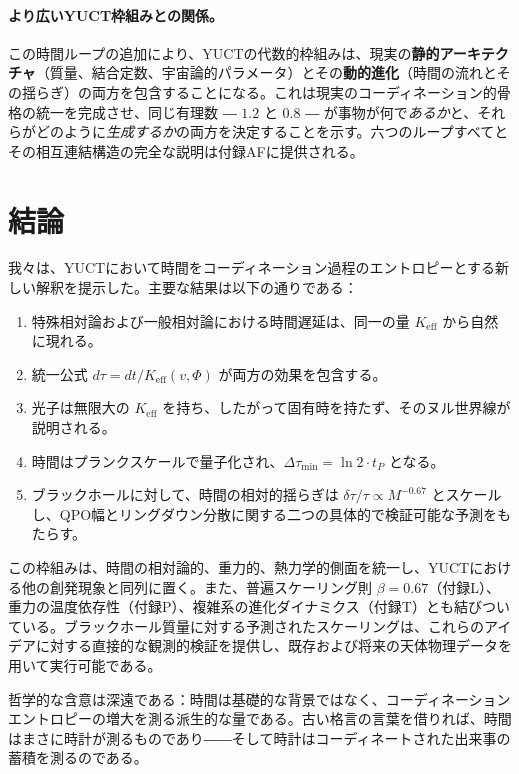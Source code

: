 \documentclass[12pt,a4paper]{article}
\newcommand{\Keff}{K_{\mathrm{eff}}}
\begin{document}
	\paragraph{より広いYUCT枠組みとの関係。}
	この時間ループの追加により、YUCTの代数的枠組みは、現実の\textbf{静的アーキテクチャ}（質量、結合定数、宇宙論的パラメータ）とその\textbf{動的進化}（時間の流れとその揺らぎ）の両方を包含することになる。これは現実のコーディネーション的骨格の統一を完成させ、同じ有理数 ― \(1.2\) と \(0.8\) ― が事物が何で\textit{あるか}と、それらがどのように\textit{生成するか}の両方を決定することを示す。六つのループすべてとその相互連結構造の完全な説明は付録AFに提供される。
	
	\section{結論}
	
	我々は、YUCTにおいて時間をコーディネーション過程のエントロピーとする新しい解釈を提示した。主要な結果は以下の通りである：
	\begin{enumerate}
		\item 特殊相対論および一般相対論における時間遅延は、同一の量 \(\Keff\) から自然に現れる。
		\item 統一公式 \(d\tau = dt/\Keff(v,\Phi)\) が両方の効果を包含する。
		\item 光子は無限大の \(\Keff\) を持ち、したがって固有時を持たず、そのヌル世界線が説明される。
		\item 時間はプランクスケールで量子化され、\(\Delta \tau_{\min} = \ln 2 \cdot t_P\) となる。
		\item ブラックホールに対して、時間の相対的揺らぎは \(\delta\tau/\tau \propto M^{-0.67}\) とスケールし、QPO幅とリングダウン分散に関する二つの具体的で検証可能な予測をもたらす。
	\end{enumerate}
	
	この枠組みは、時間の相対論的、重力的、熱力学的側面を統一し、YUCTにおける他の創発現象と同列に置く。また、普遍スケーリング則 \(\beta = 0.67\)（付録L）、重力の温度依存性（付録P）、複雑系の進化ダイナミクス（付録T）とも結びついている。ブラックホール質量に対する予測されたスケーリングは、これらのアイデアに対する直接的な観測的検証を提供し、既存および将来の天体物理データを用いて実行可能である。
	
	哲学的な含意は深遠である：時間は基礎的な背景ではなく、コーディネーションエントロピーの増大を測る派生的な量である。古い格言の言葉を借りれば、時間はまさに時計が測るものであり――そして時計はコーディネートされた出来事の蓄積を測るのである。
	
\end{document}
